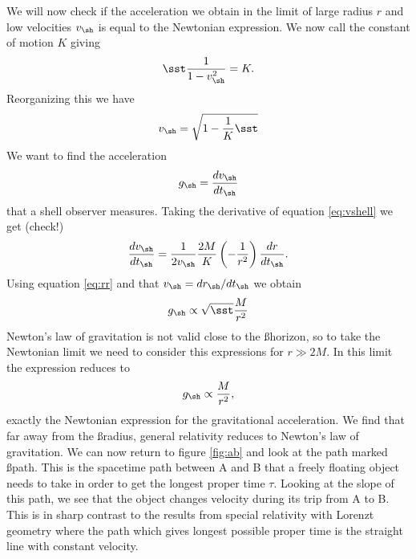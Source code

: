 {\begin{multicols}{2}
We will now check if the acceleration we obtain in the limit of large radius $r$ and low velocities $v_\sh$ is equal to the Newtonian expression. We now call the constant of motion $K$ giving
\[
\sst\frac{1}{1-v_\sh^2}=K.
\]
Reorganizing this we have
\begin{equation}
\label{eq:vshell}
v_\sh=\sqrt{1-\frac{1}{K}\sst}
\end{equation}
We want to find the acceleration
\[
g_\sh=\frac{dv_\sh}{dt_\sh}
\]
that a shell observer measures. Taking the derivative of equation \ref{eq:vshell} we get (check!)
\[
\frac{dv_\sh}{dt_\sh}=\frac{1}{2v_\sh}\frac{2M}{K}\left(-\frac{1}{r^2}\right)\frac{dr}{dt_\sh}.
\]
Using equation \ref{eq:rr} and that $v_\sh=dr_\sh/dt_\sh$ we obtain
\[
g_\sh\propto \sqrt{\sst}\frac{M}{r^2}
\]
Newton's law of gravitation is not valid close to the \ss horizon, so to take the Newtonian limit we need to consider this expressions for $r\gg2M$. In this limit the expression reduces to
\[
g_\sh\propto\frac{M}{r^2},
\]
exactly the Newtonian expression for the gravitational acceleration. We find that far away from the \ss radius, general relativity reduces to Newton's law of gravitation. We can now return to figure \ref{fig:ab} and look at the path marked \ss path. This is the spacetime path between A and B that a freely floating object needs to take in order to get the longest proper time $\tau$. Looking at the slope of this path, we see that the object changes velocity during its trip from A to B. This is in sharp contrast to the results from special relativity with Lorenzt geometry where the path which gives longest possible proper time is the straight line with constant velocity.


\end{multicols}}
